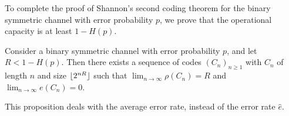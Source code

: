 To complete the proof of Shannon's second coding theorem for the binary symmetric channel with error probability \( p \), we prove that the operational capacity is at least \( 1 - H(p) \).
\begin{proposition}
    Consider a binary symmetric channel with error probability \( p \), and let \( R < 1 - H(p) \).
    Then there exists a sequence of codes \( (C_n)_{n \geq 1} \) with \( C_n \) of length \( n \) and size \( \lfloor2^{nR}\rfloor \) such that \( \lim_{n \to \infty} \rho(C_n) = R \) and \( \lim_{n \to \infty} e(C_n) = 0 \).
\end{proposition}
\begin{remark}
    This proposition deals with the average error rate, instead of the error rate \( \hat e \).
\end{remark}

